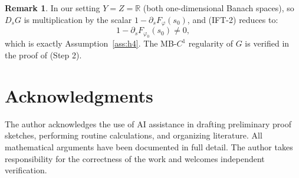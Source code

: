 \documentclass[12pt,letterpaper]{article}
\theoremstyle{definition}
\newtheorem{remark}[theorem]{Remark}
\newcommand{\R}{\mathbb{R}}
\begin{document}
\begin{remark}
In our setting $Y = Z = \R$ (both one-dimensional Banach spaces), so $D_s G$ is multiplication by the scalar $1 - \partial_s F_\varphi(s_0)$, and (IFT-2) reduces to:
\[ 1 - \partial_s F_{\varphi_0}(s_0) \neq 0, \]
which is exactly Assumption~\ref{ass:h4}. The MB-$C^1$ regularity of $G$ is verified in the proof of  (Step 2).
\end{remark}

\section*{Acknowledgments}

The author acknowledges the use of AI assistance in drafting preliminary proof sketches, performing routine calculations, and organizing literature. All mathematical arguments have been documented in full detail. The author takes responsibility for the correctness of the work and welcomes independent verification.
\end{document}
